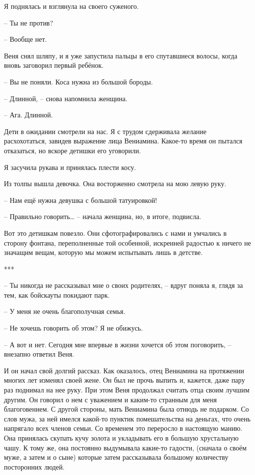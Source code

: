 \documentclass[
]{book}
\begin{document}
Я поднялась и взглянула на своего суженого.

-- Ты не против?

-- Вообще нет.

Веня снял шляпу, и я уже запустила пальцы в его спутавшиеся волосы, когда вновь заговорил первый ребёнок.

-- Вы не поняли. Коса нужна из большой бороды.

-- Длинной, -- снова напомнила женщина.

-- Ага. Длинной.

Дети в ожидании смотрели на нас. Я с трудом сдерживала желание расхохотаться, завидев выражение лица Вениамина. Какое-то время он пытался отказаться, но вскоре детишки его уговорили.

Я засучила рукава и принялась плести косу.

Из толпы вышла девочка. Она восторженно смотрела на мою левую руку.

-- Нам ещё нужна девушка с большой татуировкой!

-- Правильно говорить\ldots{} -- начала женщина, но, в итоге, подвисла.

Вот это детишкам повезло. Они сфотографировались с нами и умчались в сторону фонтана, переполненные той особенной, искренней радостью к ничего не значащим вещам, которую мы можем испытывать лишь в детстве.

***

-- Ты никогда не рассказывал мне о своих родителях, -- вдруг поняла я, глядя за тем, как бойскауты покидают парк.

-- У меня не очень благополучная семья.

-- Не хочешь говорить об этом? Я не обижусь.

-- А вот и нет. Сегодня мне впервые в жизни хочется об этом поговорить, -- внезапно ответил Веня.

И он начал свой долгий рассказ. Как оказалось, отец Вениамина на протяжении многих лет изменял своей жене. Он был не прочь выпить и, кажется, даже пару раз поднимал на нее руку. При этом Веня продолжал считать отца своим лучшим другим. Он говорил о нем с уважением и каким-то странным для меня благоговением. С другой стороны, мать Вениамина была отнюдь не подарком. Со слов мужа, за ней имелся какой-то пунктик помешательства на деньгах, что очень напрягало всех членов семьи. Со временем это переросло в настоящую манию. Она принялась скупать кучу золота и укладывать его в большую хрустальную чашу. К тому же, она постоянно выдумывала какие-то гадости, (сначала о своём муже, а затем и о сыне) которые затем рассказывала большому количеству посторонних людей.
\end{document}
